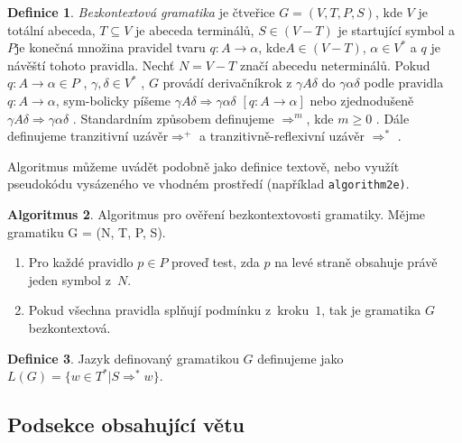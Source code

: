 \documentclass[a4paper, 11pt]{article}
\theoremstyle{definition}
\newtheorem{definition}{Definice}[section]
\theoremstyle{theorem}
\newtheorem{algorithm}[definition]{Algoritmus}
\begin{document}
\begin{definition}
\label{firstDefinition}
{\em Bezkontextová gramatika} je čtveřice $G=(V,T,P,S)$, kde $V$ je totální abeceda,
$T \subseteq V$ je abeceda terminálů, $S \in (V-T)$ je startující symbol a $P$\linebreak je konečná množina pravidel
tvaru $q\colon A\rightarrow \alpha$, kde\linebreak $A \in (V-T)$, $\alpha \in V^*$ a $q$ je návěští tohoto pravidla. Nechť $N=V-T$ značí abecedu neterminálů.
Po\-kud $q\colon A \rightarrow \alpha \in P$ , $\gamma,\delta \in V^*$ , $G$ provádí derivační\linebreak krok z $\gamma A \delta$ do $\gamma \alpha \delta$ podle pravidla $q\colon A \rightarrow \alpha$, sym\--bolicky píšeme
$\gamma A \delta \Rightarrow \gamma \alpha \delta$ $[q\colon A \rightarrow \alpha ] $ nebo zjed\-nodušeně $\gamma A \delta \Rightarrow \gamma \alpha \delta$ . Standardním způsobem definu\-jeme $\Rightarrow^m$, kde $m\geq0$ . Dále definujeme tranzitivní uzávěr\linebreak $\Rightarrow^+$ a tranzitivně-reflexivní uzávěr $\Rightarrow^*$ .
\end{definition}

Algoritmus můžeme uvádět podobně jako definice textově, nebo využít pseudokódu vysázeného ve vhodném prostředí (například {\tt algorithm2e)}.

\begin{algorithm}

Algoritmus pro ověření bezkontextovosti gramatiky. Mějme gramatiku G = (N, T, P, S).

\begin{enumerate}
 \item Pro každé pravidlo $p \in P$ proveď test, zda $p$ na levé straně obsahuje právě jeden symbol z~$N$.
 \item Pokud všechna pravidla splňují podmínku z~kroku~$1$, tak je gramatika $G$ bezkontextová.

\end{enumerate}


\end{algorithm}

\begin{definition}
Jazyk definovaný gramatikou  $G$ definujeme jako $L(G)=\{w \in T^* | S \Rightarrow^* w \} $.
\end{definition}

\subsection{ Podsekce obsahující větu}
\end{document}
